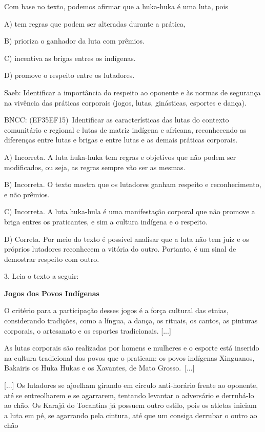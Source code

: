 Com base no texto, podemos afirmar que a huka-huka é uma luta, pois

A) tem regras que podem ser alteradas durante a prática,

B) prioriza o ganhador da luta com prêmios.

C) incentiva as brigas entres os indígenas.

D) promove o respeito entre os lutadores.

Saeb: Identificar a importância do respeito ao oponente e às normas de
segurança na vivência das práticas corporais (jogos, lutas, ginásticas,
esportes e dança).

BNCC: (EF35EF15)~Identificar as características das lutas do contexto
comunitário e regional e lutas de matriz indígena e africana,
reconhecendo as diferenças entre lutas e brigas e entre lutas e as
demais práticas corporais.

A) Incorreta. A luta huka-huka tem regras e objetivos que não podem ser
modificados, ou seja, as regras sempre vão ser as mesmas.

B) Incorreta. O texto mostra que os lutadores ganham respeito e
reconhecimento, e não prêmios.

C) Incorreta. A luta huka-hula é uma manifestação corporal que não
promove a briga entres os praticantes, e sim a cultura indígena e o
respeito.

D) Correta. Por meio do texto é possível analisar que a luta não tem
juiz e os próprios lutadores reconhecem a vitória do outro. Portanto, é
um sinal de demostrar respeito com outro.

3. Leia o texto a seguir:

\textbf{Jogos dos Povos Indígenas}

O critério para a participação desses jogos é a força cultural das
etnias, considerando tradições, como a língua, a dança, os rituais, os
cantos, as pinturas corporais, o artesanato e os esportes tradicionais.
{[}...{]}

As lutas corporais são realizadas por homens e mulheres e o esporte está
inserido na cultura tradicional dos povos que o praticam: os povos
indígenas Xinguanos, Bakairis os Huka Hukas e os Xavantes, de Mato
Grosso.~{[}...{]}

{[}...{]} Os lutadores se ajoelham girando em círculo anti-horário
frente ao oponente, até se entreolharem e se agarrarem, tentando
levantar o adversário e derrubá-lo ao chão. Os Karajá do Tocantins já
possuem outro estilo, pois os atletas iniciam a luta em pé, se agarrando
pela cintura, até que um consiga derrubar o outro ao chão

